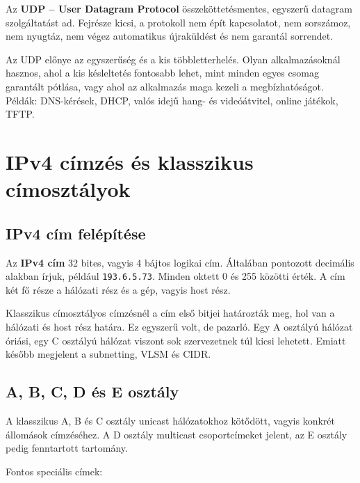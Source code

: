 Az \textbf{UDP -- User Datagram Protocol} összeköttetésmentes, egyszerű datagram szolgáltatást ad. Fejrésze kicsi, a protokoll nem épít kapcsolatot, nem sorszámoz, nem nyugtáz, nem végez automatikus újraküldést és nem garantál sorrendet.

Az UDP előnye az egyszerűség és a kis többletterhelés. Olyan alkalmazásoknál hasznos, ahol a kis késleltetés fontosabb lehet, mint minden egyes csomag garantált pótlása, vagy ahol az alkalmazás maga kezeli a megbízhatóságot. Példák: DNS-kérések, DHCP, valós idejű hang- és videóátvitel, online játékok, TFTP.

\begin{center}

\end{center}

\section{IPv4 címzés és klasszikus címosztályok}

\subsection{IPv4 cím felépítése}

Az \textbf{IPv4 cím} 32 bites, vagyis 4 bájtos logikai cím. Általában pontozott decimális alakban írjuk, például \texttt{193.6.5.73}. Minden oktett 0 és 255 közötti érték. A cím két fő része a hálózati rész és a gép, vagyis host rész.

Klasszikus címosztályos címzésnél a cím első bitjei határozták meg, hol van a hálózati és host rész határa. Ez egyszerű volt, de pazarló. Egy A osztályú hálózat óriási, egy C osztályú hálózat viszont sok szervezetnek túl kicsi lehetett. Emiatt később megjelent a subnetting, VLSM és CIDR.

\subsection{A, B, C, D és E osztály}

\begin{center}

\end{center}

A klasszikus A, B és C osztály unicast hálózatokhoz kötődött, vagyis konkrét állomások címzéséhez. A D osztály multicast csoportcímeket jelent, az E osztály pedig fenntartott tartomány.

Fontos speciális címek:

